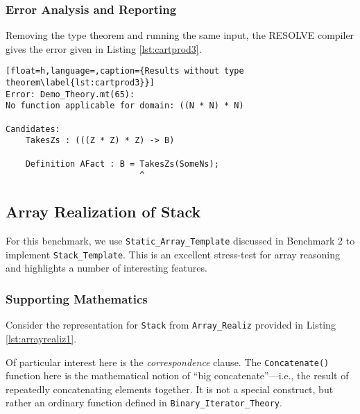 		\subsubsection{Error Analysis and Reporting}	

Removing the type theorem and running the same input, the RESOLVE compiler gives the error given in Listing \ref{lst:cartprod3}.

\begin{lstlisting}[float=h,language=,caption={Results without type theorem\label{lst:cartprod3}}]
Error: Demo_Theory.mt(65):
No function applicable for domain: ((N * N) * N)

Candidates:
	TakesZs : (((Z * Z) * Z) -> B)

	Definition AFact : B = TakesZs(SomeNs);
	                       ^
\end{lstlisting}

	\subsection{Array Realization of Stack}	

For this benchmark, we use \texttt{Static\_Array\_Template} discussed in Benchmark 2 to implement \texttt{Stack\_Template}. This is an excellent stress-test for array reasoning and highlights a number of interesting features.

		\subsubsection{Supporting Mathematics}	

Consider the representation for \texttt{Stack} from \texttt{Array\_Realiz} provided in Listing \ref{lst:arrayrealiz1}.



Of particular interest here is the \emph{correspondence} clause.  The \texttt{Concatenate()} function here is the mathematical notion of ``big concatenate''---i.e., the result of repeatedly concatenating elements together.  It is not a special construct, but rather an ordinary function defined in \texttt{Binary\_Iterator\_Theory}.

